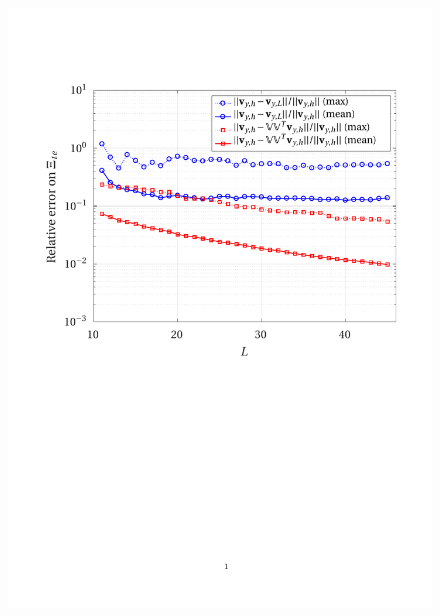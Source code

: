 \documentclass[12pt, a4paper, twoside, openright]{report}
\numberwithin{equation}{chapter}
\theoremstyle{theorem}
\theoremstyle{definition}
\theoremstyle{remark}
\theoremstyle{proposition}
\numberwithin{figure}{chapter}
\begin{document}
	\begin{figure}[H]
		\center
		\includegraphics[scale = 0.75, trim = {1.5cm 12cm 1cm 3.5cm}, clip]{dc_400_vy_error_vs_rank}
	\end{figure}
	
\end{document}
